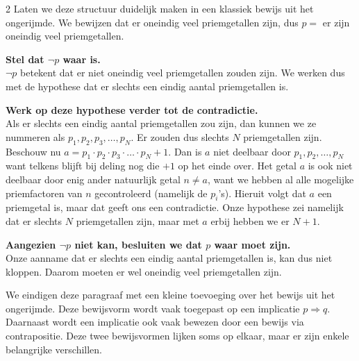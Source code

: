 \begin{multicols}{2}
Laten we deze structuur duidelijk maken in een klassiek bewijs uit het ongerijmde.
We bewijzen dat er oneindig veel priemgetallen zijn, dus $p=$ er zijn oneindig veel priemgetallen.
\begin{opsomming}
    \item \textbf{Stel dat $\lnot p$ waar is.}\\
    $\lnot p$ betekent dat er niet oneindig veel priemgetallen zouden zijn.
    We werken dus met de hypothese dat er slechts een eindig aantal priemgetallen is.
    \item \textbf{Werk op deze hypothese verder tot de contradictie.}\\
    Als er slechts een eindig aantal priemgetallen zou zijn, dan kunnen we ze nummeren als $p_1,p_2,p_3,\ldots,p_N$.
    Er zouden dus slechts $N$ priemgetallen zijn.
    Beschouw nu $a = p_1\cdot p_2 \cdot p_3 \cdot \ldots \cdot p_N+1$.
    Dan is $a$ niet deelbaar door $p_1,p_2,\ldots,p_N$ want telkens blijft bij deling nog die $+1$ op het einde over.
    Het getal $a$ is ook niet deelbaar door enig ander natuurlijk getal $n \neq a$, want we hebben al alle mogelijke priemfactoren van $n$ gecontroleerd (namelijk de $p_i$'s).
    Hieruit volgt dat $a$ een priemgetal is, maar dat geeft ons een contradictie.
    Onze hypothese zei namelijk dat er slechts $N$ priemgetallen zijn, maar met $a$ erbij hebben we er $N+1$.
    \item \textbf{Aangezien $\lnot p$ niet kan, besluiten we dat $p$ waar moet zijn.}\\
    Onze aanname dat er slechts een eindig aantal priemgetallen is, kan dus niet kloppen.
    Daarom moeten er wel oneindig veel priemgetallen zijn.
\end{opsomming}

We eindigen deze paragraaf met een kleine toevoeging over het bewijs uit het ongerijmde.
Deze bewijsvorm wordt vaak toegepast op een implicatie $p \Rightarrow q$.
Daarnaast wordt een implicatie ook vaak bewezen door een bewijs via contrapositie.
Deze twee bewijsvormen lijken soms op elkaar, maar er zijn enkele belangrijke verschillen.\\


\end{multicols}
